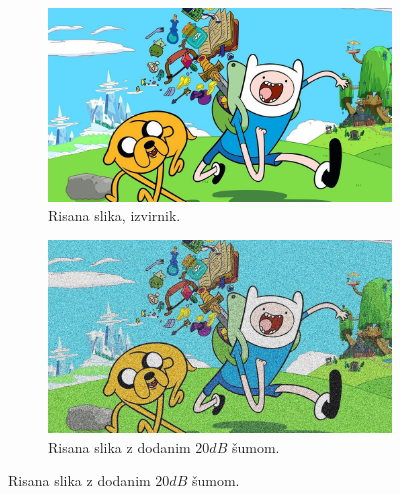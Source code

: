 \documentclass[a4paper,11pt]{article}
\begin{document}
\begin{figure}
\begin{subfigure}[t]{0.48\textwidth}
\includegraphics[width=1\textwidth]{images/adventuretime.jpg}
\caption{Risana slika, izvirnik.} \label{noisy:origin}
\end{subfigure}
\hspace*{\fill} %
\begin{subfigure}[t]{0.48\textwidth}
\includegraphics[width=1\textwidth]{images/noisy.jpg}
\caption{Risana slika z dodanim $20dB$ šumom.} \label{noisy}
\end{subfigure}


\end{figure}
\end{document}
